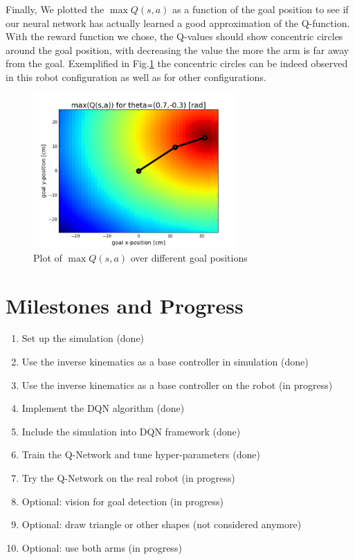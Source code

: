 \documentclass{article}
\begin{document}
Finally, We plotted the $\max Q(s,a)$ as a function of the goal position to see if our neural network has actually learned a good approximation of the Q-function. With the reward function we chose, the Q-values should show concentric circles around the goal position, with decreasing the value the more the arm is far away from the goal. Exemplified in Fig.\ref{fig:maxQforTheta} the concentric circles can be indeed observed in this robot configuration as well as for other configurations.

\begin{figure}[H]
	\centering
	\includegraphics[width=0.7\textwidth]{reportpics/maxQforTheta.png}
	\caption{Plot of $\max Q(s,a)$ over different goal positions}
	\label{fig:maxQforTheta}
\end{figure}

\section{Milestones and Progress}
\begin{enumerate}
\item Set up the simulation (done)
\item Use the inverse kinematics as a base controller in simulation (done)
\item Use the inverse kinematics as a base controller on the robot (in progress)
\item Implement the DQN algorithm (done)
\item Include the simulation into DQN framework (done)
\item Train the Q-Network and tune hyper-parameters (done)
\item Try the Q-Network on the real robot (in progress)
\item Optional: vision for goal detection (in progress)
\item Optional: draw triangle or other shapes (not considered anymore)
\item Optional: use both arms (in progress)
\end{enumerate}
\end{document}
